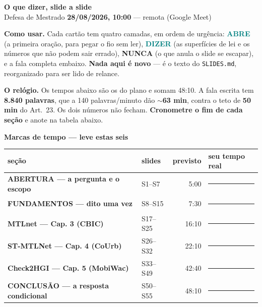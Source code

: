 \documentclass[11pt,a4paper]{article}
\begin{document}
\begin{center}
{\Huge\bfseries\color{teal} O que dizer, slide a slide}\\[3mm]
{\large Defesa de Mestrado \textbf{28/08/2026, 10:00} --- remota (Google Meet)}
\end{center}
\vspace{3mm}
\begin{tcolorbox}[colback=band,colframe=teal,boxrule=0.8pt,arc=2pt]
\textbf{Como usar.} Cada cartão tem quatro camadas, em ordem de urgência:
\textbf{\textcolor{teal}{ABRE}} (a primeira oração, para pegar o fio sem ler),
\textbf{\textcolor{teal}{DIZER}} (as superfícies de lei e os números que não podem sair errado),
\textbf{\textcolor{crim}{NUNCA}} (o que anula o slide se escapar), e a fala completa embaixo.
\textbf{Nada aqui é novo} --- é o texto do \texttt{SLIDES.md}, reorganizado para ser lido de relance.
\smallskip

\textbf{\textcolor{crim}{O relógio.}} Os tempos abaixo são os do plano e somam 48:10.
A fala escrita tem \textbf{8.840 palavras}, que a 140 palavras/minuto dão \textbf{$\sim$63 min},
contra o teto de \textbf{50 min} do Art.~23. Os dois números não fecham.
\textbf{Cronometre o fim de cada seção} e anote na tabela abaixo.
\end{tcolorbox}
\vspace{4mm}

{\large\bfseries\color{teal} Marcas de tempo --- leve estas seis}
\vspace{2mm}

\begin{tabular}{@{}p{62mm} p{22mm} r p{34mm}@{}}
\hline
\textbf{seção} & \textbf{slides} & \textbf{previsto} & \textbf{seu tempo real} \\
\hline

\textbf{ABERTURA --- a pergunta e o escopo} & S1--S7 & 5:00 & \rule{32mm}{0.4pt} \\
\textbf{FUNDAMENTOS --- dito uma vez} & S8--S15 & 7:30 & \rule{32mm}{0.4pt} \\
\textbf{MTLnet --- Cap. 3 (CBIC)} & S17--S25 & 16:10 & \rule{32mm}{0.4pt} \\
\textbf{ST-MTLNet --- Cap. 4 (CoUrb)} & S26--S32 & 22:10 & \rule{32mm}{0.4pt} \\
\textbf{Check2HGI --- Cap. 5 (MobiWac)} & S33--S49 & 42:40 & \rule{32mm}{0.4pt} \\
\textbf{CONCLUSÃO --- a resposta condicional} & S50--S55 & 48:10 & \rule{32mm}{0.4pt} \\
\hline
\end{tabular}
\clearpage
\end{document}

